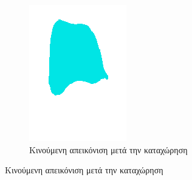 \documentclass[a4paper,12pt]{article}
\begin{document}
\begin{figure}[H]
\begin{subfigure}[t]{0.4\linewidth}
    \includegraphics[width=\linewidth]{moving_label_after_registration_3.png}
    \caption{Κινούμενη απεικόνιση μετά την καταχώρηση}
    \end{subfigure}


\end{figure}
\end{document}
